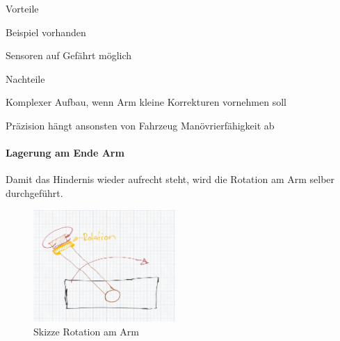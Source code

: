 \documentclass[../main.tex]{subfiles}
\begin{document}
\begin{minipage}[t]{0.48\textwidth}
    \begin{items}
          \item [Vorteile]
          \item Beispiel vorhanden
          \item Sensoren auf Gefährt möglich
    \end{items}
\end{minipage}
\hfill
\begin{minipage}[t]{0.48\textwidth}
    \begin{items}
          \item [Nachteile]
          \item Komplexer Aufbau, wenn Arm kleine Korrekturen vornehmen soll
          \item Präzision hängt ansonsten von Fahrzeug Manövrierfähigkeit ab
    \end{items}
\end{minipage}
\newpage
\paragraph{Lagerung am Ende Arm}
Damit das Hindernis wieder aufrecht steht, wird die Rotation am Arm selber durchgeführt. 

\begin{figure}[H]
        \centering
        \includegraphics[width=0.48\textwidth]{img/technologierecherche/Rotation/ueberkopf_griff_gelagert.jpg}
        \caption{Skizze Rotation am Arm}
        \label{img:tech_ueberkopf_griff_gelagert}
\end{figure}
\end{document}
